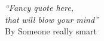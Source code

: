 
\cleardoublepage
\thispagestyle{plain}

\vspace*{8cm}

\begin{flushright}
   \textsl{``Fancy quote here, \\
           that will blow your mind''} \\
\vspace*{1.5cm}
           By Someone really smart
\end{flushright}
